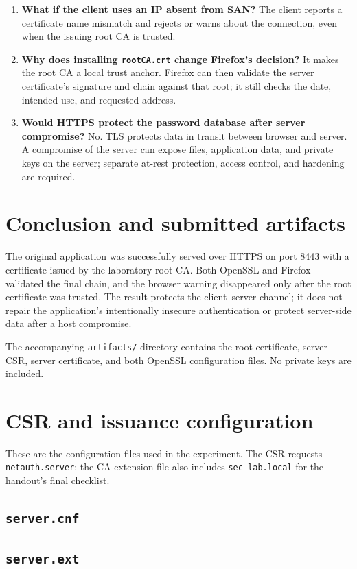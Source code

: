 \documentclass[a4paper,11pt]{article}
\begin{document}
\begin{enumerate}[leftmargin=*,label=\textbf{\arabic*.}]
\item \textbf{What if the client uses an IP absent from SAN?}
The client reports a certificate name mismatch and rejects or warns about the
connection, even when the issuing root CA is trusted.

\item \textbf{Why does installing \texttt{rootCA.crt} change Firefox's decision?}
It makes the root CA a local trust anchor. Firefox can then validate the server
certificate's signature and chain against that root; it still checks the date,
intended use, and requested address.

\item \textbf{Would HTTPS protect the password database after server compromise?}
No. TLS protects data in transit between browser and server. A compromise of the
server can expose files, application data, and private keys on the server; separate
at-rest protection, access control, and hardening are required.
\end{enumerate}

\section{Conclusion and submitted artifacts}
The original application was successfully served over HTTPS on port 8443 with a
certificate issued by the laboratory root CA. Both OpenSSL and Firefox validated the
final chain, and the browser warning disappeared only after the root certificate was
trusted. The result protects the client--server channel; it does not repair the
application's intentionally insecure authentication or protect server-side data after
a host compromise.

The accompanying \texttt{artifacts/} directory contains the root certificate,
server CSR, server certificate, and both OpenSSL configuration files. No private
keys are included.

\appendix
\section{CSR and issuance configuration}
These are the configuration files used in the experiment. The CSR requests
\texttt{netauth.server}; the CA extension file also includes
\texttt{sec-lab.local} for the handout's final checklist.

\subsection*{\texttt{server.cnf}}

\subsection*{\texttt{server.ext}}

\end{document}
